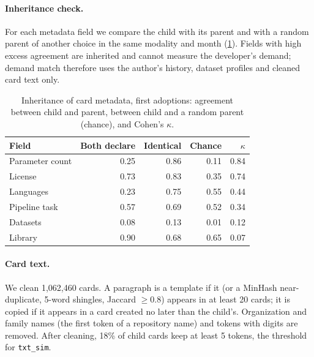 \paragraph{Inheritance check.}
For each metadata field we compare the child with its parent and with a random parent of another choice in the same
modality and month (\cref{tab:inherit}). Fields with high excess agreement are inherited and cannot measure the
developer's demand; demand match therefore uses the author's history, dataset profiles and cleaned card text only.

\begin{table}[h]
\centering
\caption{Inheritance of card metadata, first adoptions: agreement between child and parent, between child and a
random parent (chance), and Cohen's $\kappa$.}
\label{tab:inherit}
\small
\begin{tabular}{lrrrr}
\toprule
Field & Both declare & Identical & Chance & $\kappa$ \\
\midrule
Parameter count & 0.25 & 0.86 & 0.11 & 0.84 \\
License & 0.73 & 0.83 & 0.35 & 0.74 \\
Languages & 0.23 & 0.75 & 0.55 & 0.44 \\
Pipeline task & 0.57 & 0.69 & 0.52 & 0.34 \\
Datasets & 0.08 & 0.13 & 0.01 & 0.12 \\
Library & 0.90 & 0.68 & 0.65 & 0.07 \\
\bottomrule
\end{tabular}
\end{table}

\paragraph{Card text.}
We clean 1,062,460 cards. A paragraph is a template if it (or a MinHash near-duplicate, 5-word shingles, Jaccard
$\ge 0.8$) appears in at least 20 cards; it is copied if it appears in a card created no later than the child's.
Organization and family names (the first token of a repository name) and tokens with digits are removed. After
cleaning, 18\% of child cards keep at least 5 tokens, the threshold for \texttt{txt\_sim}.
